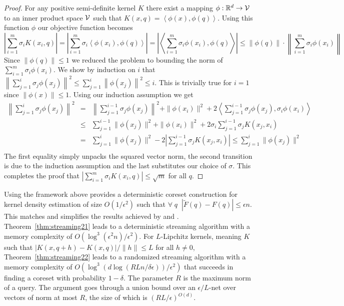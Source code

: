 \documentclass[anon,12pt]{colt2019} %
\newcommand{\ip}[1]{\left \langle #1 \right \rangle}
\newcommand{\R}{\mathbb{R}}
\newcommand{\eps}{\epsilon}
\begin{document}
{\begin{proof}
For any positive semi-definite kernel $K$ there exist a mapping $\phi: \R^d \to {\cal V}$ to an inner product space $\cal V$ such that 
$ K(x,q) = \ip{\phi(x), \phi(q)} $.
Using this function $\phi$ our objective function becomes
\[
|\sum_{i=1}^m \sigma_i K(x_i,q)| = |\sum_{i=1}^m \sigma_i \ip{\phi(x_i), \phi(q)} | = \left| \ip{ \sum_{i=1}^m \sigma_i \phi(x_i), \phi(q)}\right| \leq  \|\phi(q)\| \cdot \left\|  \sum_{i=1}^m \sigma_i \phi(x_i) \right\| 
\]
Since $\|\phi(q)\| \leq 1$ we reduced the problem to bounding the norm of $ \sum_{i=1}^m \sigma_i \phi(x_i) $.
%
We show by induction on $i$ that 
$\left\| \sum_{j=1}^i \sigma_j \phi(x_j) \right\|^2 \le \sum_{j=1}^i \left\|\phi(x_j)\right\|^2 \leq i$.
This is trivially true for $i=1$ since $\|\phi(x)\| \leq 1$. 
Using our induction assumption we get
\begin{eqnarray*}
\left\| \sum_{j=1}^{i}\sigma_j \phi(x_j)\right\|^2 &=& \left\|\sum_{j=1}^{i-1}\sigma_j \phi(x_j)\right\|^2 + \|\phi(x_i)\|^2 + 2\ip{ \sum_{j=1}^{i-1}\sigma_j \phi(x_j), \sigma_i \phi(x_i)} \\
&\le& \sum_{j=1}^{i-1} \|\phi(x_j)\|^2 + \|\phi(x_i)\|^2 + 2\sigma_i \sum_{j=1}^{i-1}\sigma_j K(x_j, x_i)\\
&=& \sum_{j=1}^{i} \|\phi(x_j)\|^2 - 2\left| \sum_{j=1}^{i-1}\sigma_j K(x_j, x_i) \right| \le \sum_{j=1}^{i} \|\phi(x_j)\|^2 \\
\end{eqnarray*}
The first equality simply unpacks the squared vector norm, the second transition is due to the induction assumption and the last substitutes our choice of 
$\sigma$. This completes the proof that $|\sum_{i=1}^m \sigma_i K(x_i,q)| \le \sqrt{m}$ for all $q$.
\end{proof}

Using the framework above provides a deterministic coreset construction for kernel density estimation of size $O(1/\eps^2)$ such that $\forall \;q\;\; |\tilde F(q) - F(q)| \le \eps n$. This matches and simplifies the results achieved by \cite{DBLP:conf/soda/PhillipsT18} and \cite{DBLP:journals/corr/abs-1802-01751}. Theorem~\ref{thm:streaming21} leads to a deterministic streaming algorithm with a memory complexity of $O(\log^3(\eps^2 n)/\eps^2)$. For $L$-Lipchitz kernels, meaning $K$ such that $|K(x,q+h) - K(x,q)|/\|h\| \leq L$ for all $h \neq 0$, Theorem~\ref{thm:streaming22} leads to a randomized streaming algorithm with a memory complexity of $O\left(\log^3 \left( d \log\left(RLn/\delta\eps\right) \right) / \eps^2 \right)$ that succeeds in finding a coreset with probability $1-\delta$. The parameter $R$ is the maximum norm of a query. The argument goes through a union bound over an $\eps/L$-net over vectors of norm at most $R$, the size of which is $(RL/\eps)^{O(d)}$.

}
\end{document}
